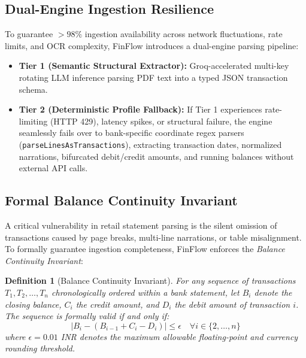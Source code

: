 \documentclass[conference]{IEEEtran}
\newtheorem{definition}{Definition}
\begin{document}
\subsection{Dual-Engine Ingestion Resilience}
To guarantee $>98\%$ ingestion availability across network fluctuations, rate limits, and OCR complexity, FinFlow introduces a dual-engine parsing pipeline:
\begin{itemize}
    \item \textbf{Tier 1 (Semantic Structural Extractor):} Groq-accelerated multi-key rotating LLM inference parsing PDF text into a typed JSON transaction schema.
    \item \textbf{Tier 2 (Deterministic Profile Fallback):} If Tier 1 experiences rate-limiting (HTTP 429), latency spikes, or structural failure, the engine seamlessly fails over to bank-specific coordinate regex parsers (\texttt{parseLinesAsTransactions}), extracting transaction dates, normalized narrations, bifurcated debit/credit amounts, and running balances without external API calls.
\end{itemize}

\subsection{Formal Balance Continuity Invariant}
A critical vulnerability in retail statement parsing is the silent omission of transactions caused by page breaks, multi-line narrations, or table misalignment. To formally guarantee ingestion completeness, FinFlow enforces the \textit{Balance Continuity Invariant}:

\begin{definition}[Balance Continuity Invariant]
For any sequence of transactions $T_1, T_2, \dots, T_n$ chronologically ordered within a bank statement, let $B_i$ denote the closing balance, $C_i$ the credit amount, and $D_i$ the debit amount of transaction $i$. The sequence is formally valid if and only if:
\begin{equation}
| B_i - (B_{i-1} + C_i - D_i) | \le \epsilon \quad \forall i \in \{2, \dots, n\}
\label{eq:continuity}
\end{equation}
where $\epsilon = 0.01$ INR denotes the maximum allowable floating-point and currency rounding threshold.
\end{definition}
\end{document}

